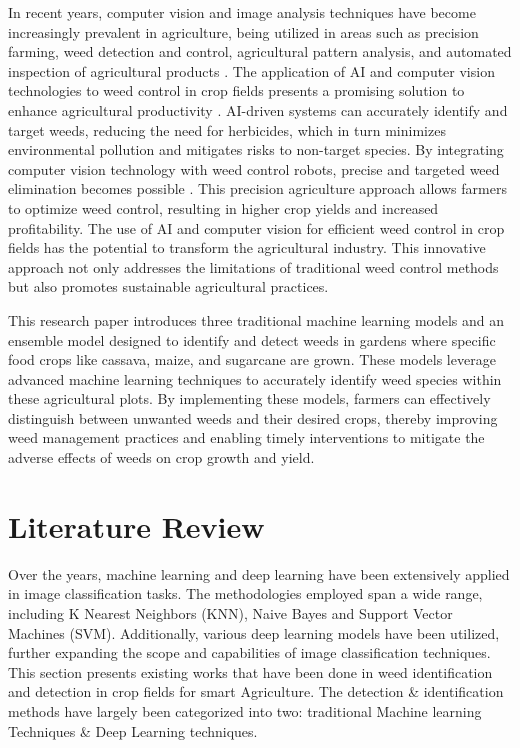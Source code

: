 \documentclass[10pt,twocolumn,letterpaper]{article}
\begin{document}
In recent years, computer vision and image analysis techniques have become increasingly prevalent in agriculture, being utilized in areas such as precision farming, weed detection and control, agricultural pattern analysis, and automated inspection of agricultural products \cite{Pun}. The application of AI and computer vision technologies to weed control in crop fields presents a promising solution to enhance agricultural productivity \cite{Chlingaryan}. AI-driven systems can accurately identify and target weeds, reducing the need for herbicides, which in turn minimizes environmental pollution and mitigates risks to non-target species. By integrating computer vision technology with weed control robots, precise and targeted weed elimination becomes possible \cite{Timmermans}. This precision agriculture approach allows farmers to optimize weed control, resulting in higher crop yields and increased profitability. The use of AI and computer vision for efficient weed control in crop fields has the potential to transform the agricultural industry. This innovative approach not only addresses the limitations of traditional weed control methods but also promotes sustainable agricultural practices.

This research paper introduces three traditional machine learning models and an ensemble model designed to identify and detect weeds in gardens where specific food crops like cassava, maize, and sugarcane are grown. These models leverage advanced machine learning techniques to accurately identify weed species within these agricultural plots. By implementing these models, farmers can effectively distinguish between unwanted weeds and their desired crops, thereby improving weed management practices and enabling timely interventions to mitigate the adverse effects of weeds on crop growth and yield.

\section{Literature Review}
Over the years, machine learning and deep learning have been extensively applied in image classification tasks. The methodologies employed span a wide range, including K Nearest Neighbors (KNN), Naive Bayes and Support Vector Machines (SVM). Additionally, various deep learning models have been utilized, further expanding the scope and capabilities of image classification techniques. This section presents existing works that have been done in weed identification and detection in crop fields for smart Agriculture. The detection \& identification methods have largely been categorized into two: traditional Machine learning Techniques \& Deep Learning techniques.
\end{document}
